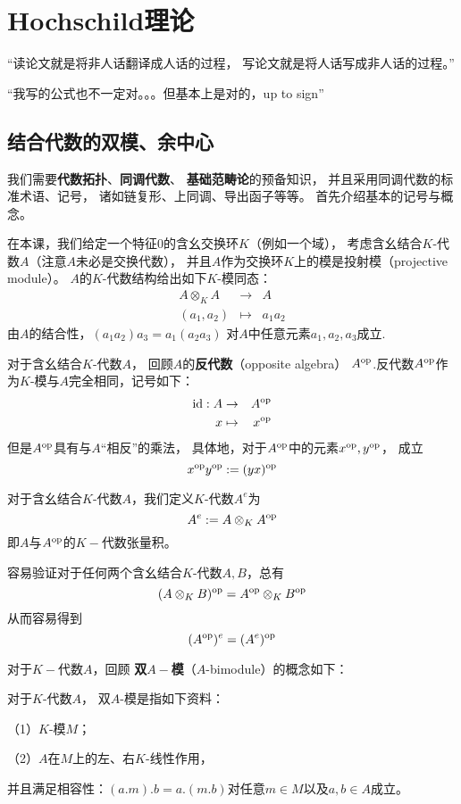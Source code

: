 \chapter{Hochschild理论}
\begin{center}
“读论文就是将非人话翻译成人话的过程，
写论文就是将人话写成非人话的过程。”              

“我写的公式也不一定对。。。但基本上是对的，up to sign”
\end{center}

\section{结合代数的双模、余中心}

我们需要\textbf{代数拓扑}、\textbf{同调代数}、
\textbf{基础范畴论}的预备知识，
并且采用同调代数的标准术语、记号，
诸如链复形、上同调、导出函子等等。
首先介绍基本的记号与概念。

在本课，我们给定一个特征$0$的含幺交换环$K$（例如一个域），
考虑含幺结合$K$-代数$A$（注意$A$未必是交换代数），
并且$A$作为交换环$K$上的模是投射模（projective module）。
$A$的$K$-代数结构给出如下$K$-模同态：
\begin{eqnarray*}
A\otimes_KA        &\rightarrow& A\\
(a_1,a_2)          &\mapsto    & a_1a_2
\end{eqnarray*}
由$A$的结合性，$(a_1a_2)a_3=a_1(a_2a_3)$
对$A$中任意元素$a_1,a_2,a_3$成立.

对于含幺结合$K$-代数$A$，
回顾$A$的\textbf{反代数}（opposite algebra）
$A^{\text{op}}$.反代数$A^{\text{op}}$作为$K$-模与$A$完全相同，记号如下：
\begin{eqnarray*}
\text{id}:A &\rightarrow & A^{\text{op}}\\
x&\mapsto&x^{\text{op}}
\end{eqnarray*}
但是$A^{\text{op}}$具有与$A$“相反”的乘法，
具体地，对于$A^{\text{op}}$中的元素$x^{\text{op}},y^{\text{op}}$，
成立
$$x^{\text{op}} y^{\text{op}}:=(yx)^{\text{op}}$$

\begin{definition}
对于含幺结合$K$-代数$A$，我们定义$K$-代数$A^e$为
$$A^e:=A\otimes_K A^{\text{op}}$$
即$A$与$A^{\text{op}}$的$K-$代数张量积。
\end{definition}

容易验证对于任何两个含幺结合$K$-代数$A,B$，总有
$$(A\otimes_K B)^{\text{op}}=A^{\text{op}}\otimes_{K}B^{\text{op}}$$
从而容易得到
$$(A^{\text{op}})^e=(A^e)^{\text{op}}$$

对于$K-$代数$A$，回顾
\textbf{双$A-$模}（$A$-bimodule）的概念如下：

\begin{definition}对于$K$-代数$A$，
双$A$-模是指如下资料：

（1）$K$-模$M$；

（2）$A$在$M$上的左、右$K$-线性作用，

并且满足相容性：$(a.m).b=a.(m.b)$对任意$m\in M$以及$a,b\in A$成立。
\end{definition}

